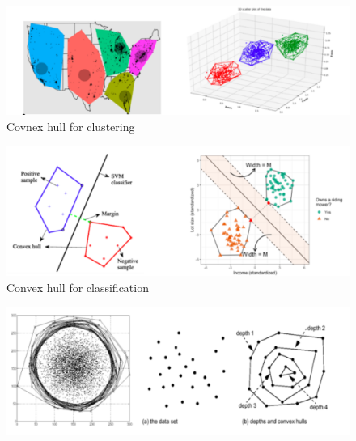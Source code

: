 \documentclass[11pt]{beamer}
\theoremstyle{definition}
\theoremstyle{plain}
\theoremstyle{plain}
\theoremstyle{remark}
\begin{document}
	\begin{frame}
		\begin{figure}
			\centering
			\includegraphics[width=0.7\linewidth]{convex_hull_for_clustering}
			\caption{Covnex hull for clustering}
			\label{fig:convexhullforclustering}
		\end{figure}
		
		\end{frame}
		\begin{frame}
			\begin{figure}
				\centering
				\includegraphics[width=0.7\linewidth]{convex_hull_for_classification}
				\caption{Convex hull for classification}
				\label{fig:convexhullforclassification}
			\end{figure}
			
		\end{frame}
		\begin{frame}
			\begin{figure}
				\centering
				\includegraphics[width=0.7\linewidth]{convex_hull_for_identify_outliers}
				\caption{}
				\label{fig:convexhullforidentifyoutliers}
			\end{figure}
			
		\end{frame}
\end{document}
